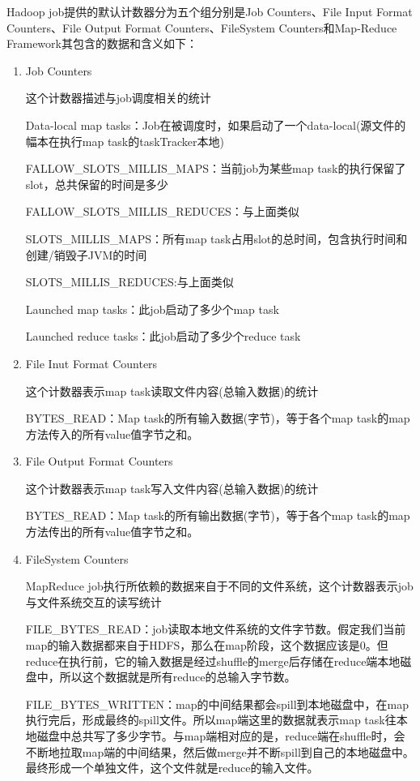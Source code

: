 Hadoop job提供的默认计数器分为五个组分别是Job Counters、File Input Format Counters、File Output Format Counters、FileSystem Counters和Map-Reduce Framework其包含的数据和含义如下：

\begin{enumerate}

\item Job Counters 

这个计数器描述与job调度相关的统计 

Data-local map tasks：Job在被调度时，如果启动了一个data-local(源文件的幅本在执行map task的taskTracker本地) 

FALLOW\_SLOTS\_MILLIS\_MAPS：当前job为某些map task的执行保留了slot，总共保留的时间是多少 

FALLOW\_SLOTS\_MILLIS\_REDUCES：与上面类似 

SLOTS\_MILLIS\_MAPS：所有map task占用slot的总时间，包含执行时间和创建/销毁子JVM的时间 

SLOTS\_MILLIS\_REDUCES:与上面类似 

Launched map tasks：此job启动了多少个map task 

Launched reduce tasks：此job启动了多少个reduce task 


\item File Inut Format Counters

这个计数器表示map task读取文件内容(总输入数据)的统计

BYTES\_READ：Map task的所有输入数据(字节)，等于各个map task的map方法传入的所有value值字节之和。 

\item File Output Format Counters

这个计数器表示map task写入文件内容(总输入数据)的统计

BYTES\_READ：Map task的所有输出数据(字节)，等于各个map task的map方法传出的所有value值字节之和。 

\item FileSystem Counters

MapReduce job执行所依赖的数据来自于不同的文件系统，这个计数器表示job与文件系统交互的读写统计 

FILE\_BYTES\_READ：job读取本地文件系统的文件字节数。假定我们当前map的输入数据都来自于HDFS，那么在map阶段，这个数据应该是0。但reduce在执行前，它的输入数据是经过shuffle的merge后存储在reduce端本地磁盘中，所以这个数据就是所有reduce的总输入字节数。 

FILE\_BYTES\_WRITTEN：map的中间结果都会spill到本地磁盘中，在map执行完后，形成最终的spill文件。所以map端这里的数据就表示map task往本地磁盘中总共写了多少字节。与map端相对应的是，reduce端在shuffle时，会不断地拉取map端的中间结果，然后做merge并不断spill到自己的本地磁盘中。最终形成一个单独文件，这个文件就是reduce的输入文件。 


\end{enumerate}
